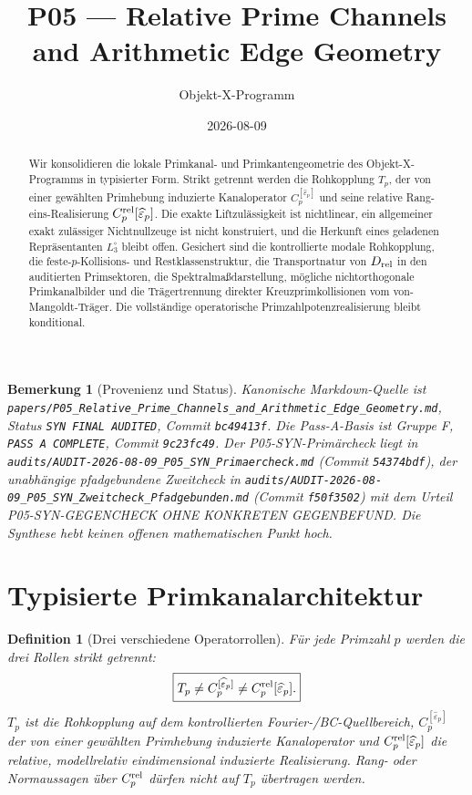 \documentclass[11pt,a4paper]{amsart}
\title[P05 --- Relative Prime Channels]{P05 --- Relative Prime Channels and Arithmetic Edge Geometry}
\author{Objekt-X-Programm}
\date{2026-08-09}
\newtheorem{definition}[theorem]{Definition}
\newtheorem{remark}[theorem]{Bemerkung}
\begin{document}
\begin{abstract}
Wir konsolidieren die lokale Primkanal- und Primkantengeometrie des
Objekt-X-Programms in typisierter Form. Strikt getrennt werden die Rohkopplung
$T_p$, der von einer gewählten Primhebung induzierte Kanaloperator
$C_p^{[\widehat\varepsilon_p]}$ und seine relative Rang-eins-Realisierung
$C_p^{\rm rel}[\widehat\varepsilon_p]$. Die exakte Liftzulässigkeit ist
nichtlinear, ein allgemeiner exakt zulässiger Nichtnullzeuge ist nicht
konstruiert, und die Herkunft eines geladenen Repräsentanten $L_3^\circ$
bleibt offen. Gesichert sind die kontrollierte modale Rohkopplung, die
feste-$p$-Kollisions- und Restklassenstruktur, die Transportnatur von
$D_{\rm rel}$ in den auditierten Primsektoren, die Spektralmaßdarstellung,
mögliche nichtorthogonale Primkanalbilder und die Trägertrennung direkter
Kreuzprimkollisionen vom von-Mangoldt-Träger. Die vollständige operatorische
Primzahlpotenzrealisierung bleibt konditional.
\end{abstract}

\maketitle

\begin{remark}[Provenienz und Status]\label{rem:provenance}
Kanonische Markdown-Quelle ist
\texttt{papers/P05\_Relative\_Prime\_Channels\_and\_Arithmetic\_Edge\_Geometry.md},
Status \texttt{SYN FINAL AUDITED}, Commit \texttt{bc49413f}. Die Pass-A-Basis
ist Gruppe F, \texttt{PASS A COMPLETE}, Commit \texttt{9c23fc49}. Der
P05-SYN-Primärcheck liegt in
\texttt{audits/AUDIT-2026-08-09\_P05\_SYN\_Primaercheck.md}
(Commit \texttt{54374bdf}), der unabhängige pfadgebundene Zweitcheck in
\texttt{audits/AUDIT-2026-08-09\_P05\_SYN\_Zweitcheck\_Pfadgebunden.md}
(Commit \texttt{f50f3502}) mit dem Urteil
\emph{P05-SYN-GEGENCHECK OHNE KONKRETEN GEGENBEFUND}. Die Synthese hebt keinen
offenen mathematischen Punkt hoch.
\end{remark}

\section{Typisierte Primkanalarchitektur}

\begin{definition}[Drei verschiedene Operatorrollen]\label{def:three-roles}
Für jede Primzahl $p$ werden die drei Rollen strikt getrennt:
\[
\boxed{T_p\neq C_p^{[\widehat\varepsilon_p]}\neq
C_p^{\rm rel}[\widehat\varepsilon_p].}
\]
$T_p$ ist die Rohkopplung auf dem kontrollierten Fourier-/BC-Quellbereich,
$C_p^{[\widehat\varepsilon_p]}$ der von einer gewählten Primhebung induzierte
Kanaloperator und $C_p^{\rm rel}[\widehat\varepsilon_p]$ die relative,
modellrelativ eindimensional induzierte Realisierung. Rang- oder Normaussagen
über $C_p^{\rm rel}$ dürfen nicht auf $T_p$ übertragen werden.
\end{definition}
\end{document}
